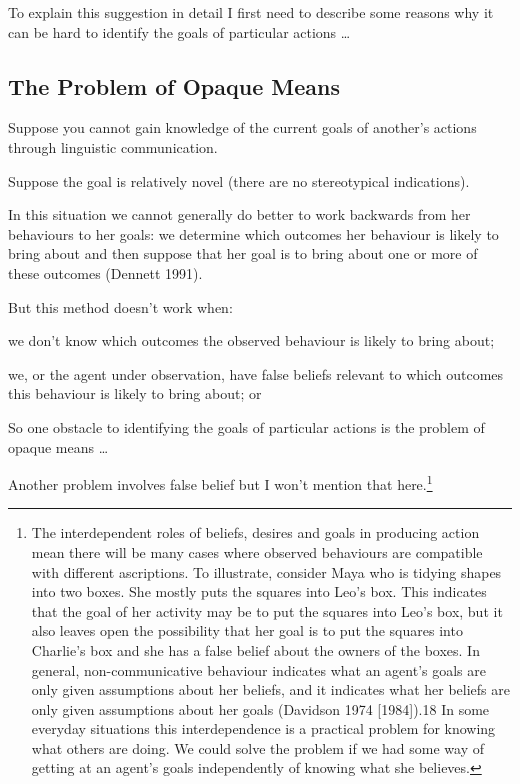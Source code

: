 \documentclass[12pt,a4paper]{extarticle}
\begin{document}
To explain this suggestion in detail I first need to describe some reasons why it can be hard to identify the goals of particular actions …


\subsection{The Problem of Opaque Means}

Suppose you cannot gain knowledge of the current goals of another's actions through linguistic communication.

Suppose the goal is relatively novel (there are no stereotypical indications).

In this situation we cannot generally do better to work backwards from her behaviours to her goals: we determine which outcomes her behaviour is likely to bring about and then suppose that her goal is to bring about one or more of these outcomes (Dennett 1991).  

But this method doesn’t work when: 
%
\begin{list}{*}{}
\item we don’t know which outcomes the observed behaviour is likely to bring about;
\item we, or the agent under observation, have false beliefs relevant to which outcomes this behaviour is likely to bring about; or
\end{list}
%
So one obstacle to identifying the goals of particular actions is the problem of opaque means …

Another problem involves false belief but I won't mention that here.\footnote{
 The interdependent roles of beliefs, desires and goals in producing action mean there will be many cases where observed behaviours are compatible with different ascriptions. To illustrate, consider Maya who is tidying shapes into two boxes. She mostly puts the squares into Leo’s box.
This indicates that the goal of her activity may be to put the squares into Leo’s box, but it also leaves open the possibility that her goal is to put the squares into Charlie’s box and she has a false belief about the owners of the boxes. In general, non-communicative behaviour indicates what an agent’s goals are only given assumptions about her beliefs, and it indicates what her beliefs are only given assumptions about her goals (Davidson 1974 [1984]).18	In some everyday situations this interdependence is a practical problem for knowing what others are doing. We could solve the problem if we had some way of getting at an agent’s goals independently of knowing what she believes.
 }
\end{document}
